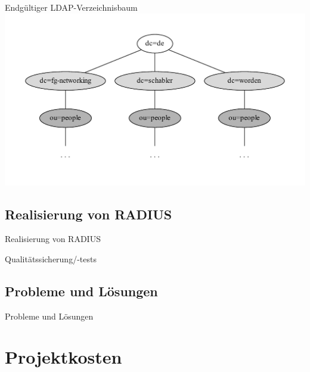 \documentclass[handout,svgnames]{beamer}
\begin{document}
\begin{frame}{Endgültiger LDAP-Verzeichnisbaum}
		\includegraphics[width=\textwidth]{Bilder/LDAP-fgn.pdf}
\end{frame}


\subsection{Realisierung von RADIUS}
\begin{frame}{Realisierung von RADIUS}

\end{frame}


\begin{frame}{Qualitätssicherung/-tests}

\end{frame}


\subsection{Probleme und Lösungen}
\begin{frame}{Probleme und Lösungen}

\end{frame}


\section{Projektkosten}
\end{document}
